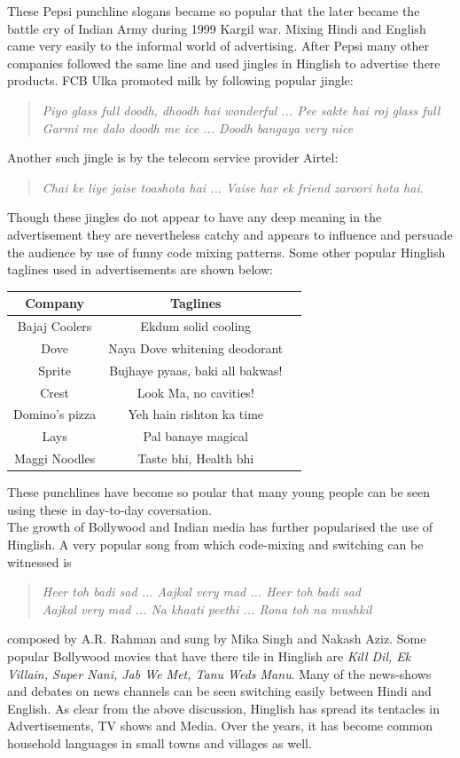 \documentclass{article}
\begin{document}
These Pepsi punchline slogans became so popular that the later became the battle cry of Indian Army during 1999 Kargil war. Mixing Hindi and English came very easily to the informal world of advertising. After Pepsi many other companies followed the same line and used jingles in Hinglish to advertise there products. FCB Ulka promoted milk by following popular jingle:
\begin{quote}
    \centering
    \textit{Piyo glass full doodh, dhoodh hai wonderful ... Pee sakte hai roj glass full\\
    Garmi me dalo doodh me ice ... Doodh bangaya very nice}

\end{quote}
Another such jingle is by the telecom service provider Airtel:
\begin{quote}
\centering
\textit{Chai ke liye jaise toashota hai ... Vaise har ek friend zaroori hota hai}. 
\end{quote}
Though these jingles do not appear to have any deep meaning in the advertisement they are nevertheless catchy and appears to influence and persuade the audience by use of funny code mixing patterns. Some other popular Hinglish taglines used in advertisements are shown below:
\begin{table}[H]
\centering
\begin{tabular}{|c|c|c|}
\hline
\textbf{Company} & \textbf{Taglines}\\
\hline \hline
Bajaj Coolers  & Ekdum solid cooling \\\hline
Dove & Naya Dove whitening deodorant \\\hline
Sprite & Bujhaye pyaas, baki all bakwas! \\\hline
Crest & Look Ma, no cavities! \\\hline
Domino’s pizza & Yeh hain rishton ka time \\\hline
Lays & Pal banaye magical \\\hline
Maggi Noodles & Taste bhi, Health bhi \\\hline
\end{tabular}  
\end{table} 
These punchlines have become so poular that many young people can be seen using these in day-to-day coversation.\\
The growth of Bollywood and Indian media has further popularised the use of Hinglish. A very popular song from which code-mixing and switching can be witnessed is 
\begin{quote}
    \centering
    \textit{Heer toh badi sad ... Aajkal very mad ... Heer toh badi sad \\
    Aajkal very mad ... Na khaati peethi ... Rona toh na mushkil}
\end{quote}
composed by A.R. Rahman and sung by Mika Singh and Nakash Aziz. Some popular Bollywood movies that have there tile in Hinglish are \textit{Kill Dil, Ek Villain, Super Nani, Jab We Met, Tanu Weds Manu}. Many of the news-shows and debates on news channels can be seen switching easily between Hindi and English. As clear from the above discussion, Hinglish has spread its tentacles in Advertisements, TV shows and Media. Over the years, it has become common household languages in small towns and villages as well.
\end{document}
